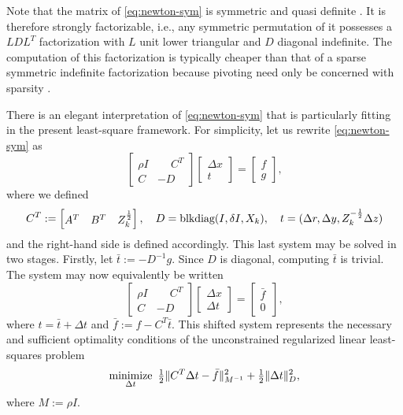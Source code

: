 \documentclass{amsart}
\begin{document}
Note that the  matrix of \eqref{eq:newton-sym} is symmetric and
quasi definite \citep{vanderbei-1995}. It is therefore strongly factorizable,
i.e., any symmetric permutation of it possesses a $LDL^T$ factorization with
$L$ unit lower triangular and $D$ diagonal indefinite. The computation of this
factorization is typically cheaper than that of a sparse symmetric indefinite
factorization because pivoting need only be concerned with sparsity
\citep{gill-saunders-shinnerl-1996}.

There is an elegant interpretation of \eqref{eq:newton-sym} that is
particularly fitting in the present least-square framework. For simplicity, let us rewrite \eqref{eq:newton-sym} as
\[
  \begin{bmatrix}
    \rho I & \phantom{-}C^T \\
    C & -D
  \end{bmatrix}
  \begin{bmatrix}
    \Delta x \\ t
  \end{bmatrix}
  =
  \begin{bmatrix}
    f \\ g
  \end{bmatrix},
  \]
where we defined
\[
  C^T :=
  \begin{bmatrix}
    A^T & B^T & Z_k^{\frac12}
  \end{bmatrix},
  \quad
  D = \mathop{\text{blkdiag}}(I, \delta I, X_k),
  \quad
  t = (\Delta r, \Delta y, Z_k^{-\frac12} \Delta z)
\]
and the right-hand side is defined accordingly. This last system may be solved
in two stages. Firstly, let $\bar{t} := -D^{-1} g$. Since $D$ is diagonal,
computing $\bar{t}$ is trivial. The system may now equivalently be written
\[
  \begin{bmatrix}
    \rho I & \phantom{-}C^T \\
    C & -D
  \end{bmatrix}
  \begin{bmatrix}
    \Delta x \\ \Delta t
  \end{bmatrix}
  =
  \begin{bmatrix}
    \bar{f} \, \\ 0
  \end{bmatrix},
\]
where $t = \bar{t} + \Delta t$ and $\bar{f} := f - C^T \bar{t}$. This shifted
system represents the necessary and sufficient optimality conditions of the
unconstrained regularized linear least-squares problem
\begin{equation}
  \label{eq:lsq-dir}
  \displaystyle\mathop{\textup{minimize}}_{\Delta t} \
  \tfrac{1}{2} \| C^T \Delta t - \bar{f} \|_{M^{-1}}^2 + \tfrac{1}{2} \|\Delta t\|_D^2,
\end{equation}
where $M := \rho I$.
\end{document}
